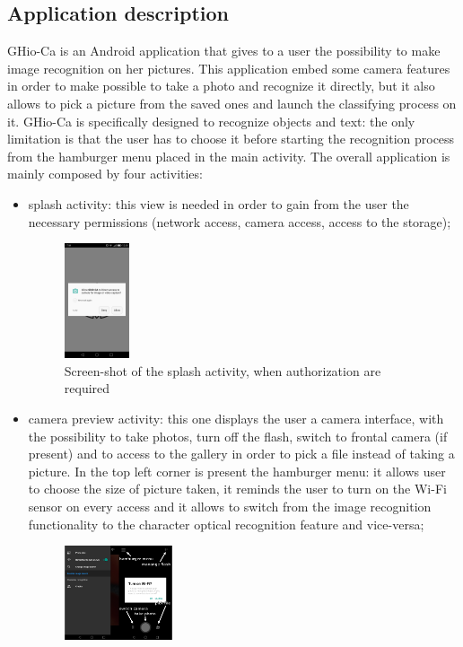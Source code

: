 \subsection{Application description}
GHio-Ca is an Android application that gives to a user the possibility to make 
image recognition on her pictures. This application embed some camera features 
in order to make possible to take a photo and recognize it directly, but it also 
allows to pick a picture from the saved ones and launch the classifying process 
on it. GHio-Ca is specifically designed to recognize objects and text: the only
limitation is that the user has to choose it before starting the
recognition process from the hamburger menu placed in the main activity.
The overall application is mainly composed by four activities:
\begin{itemize}
  \item splash activity: this view is needed in order to gain from the user
    the necessary permissions (network access, camera access, access to
    the storage);
    \begin{figure}[h]
        \centering
        \includegraphics[width=0.18\textwidth]{../img/splash}
        \caption{Screen-shot of the splash activity, when authorization are 
                 required}
        \label{fig:splash}
    \end{figure}
  \item camera preview activity: this one displays the user a camera
    interface, with the possibility to take photos, turn off the flash, switch
    to frontal camera (if present) and to access to the gallery in order to
    pick a file instead of taking a picture. In the top left corner is present
    the hamburger menu: it allows user to choose the size of picture taken,
    it reminds the user to turn on the Wi-Fi sensor on every access and it
    allows to switch from the image recognition functionality to the
    character optical recognition feature and vice-versa;
    \begin{figure}[h]
        \centering
        \includegraphics[width=0.30\textwidth]{../img/main_activity}

\end{figure}
\end{itemize}
